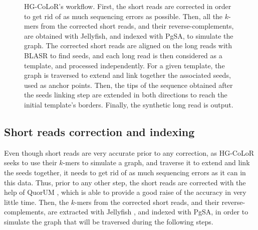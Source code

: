 \documentclass[long, final]{jobim2017}
\begin{document}
\begin{figure}
	\begin{center}
	\end{center}
	\caption{HG-CoLoR's workflow. First, the short reads are corrected in order to get rid of as much sequencing errors as possible. Then,
	all the $k$-mers from the corrected short reads, and their reverse-complements, are obtained with Jellyfish, and indexed with PgSA, to
	simulate the graph.
	The corrected short reads are aligned on the long reads with BLASR to find seeds, and each long read is then considered as a template, and
	processed
	independently. For a given template, the graph is traversed to extend and link together the associated seeds, used as
	anchor points. Then, the tips of the sequence obtained after the seeds linking step are extended in both directions to reach the initial
	template's borders. Finally, the synthetic long read is output. \label{OMWorkflow}}
\end{figure}

\subsection{Short reads correction and indexing}

Even though short reads are very accurate prior to any correction, as HG-CoLoR seeks to use their $k$-mers to simulate a graph, and traverse it to extend and link the seeds together, it needs to get rid of as much sequencing errors as it can in this data. Thus, prior to any other step, the short reads are corrected with the help of QuorUM \cite{Marcais2015}, which is able to provide a good raise of the accuracy in very little time. Then, the $k$-mers from the corrected short reads, and their reverse-complements, are extracted with Jellyfish \cite{Marcais2011}, and indexed with PgSA, in order to simulate the graph that will be traversed during the following steps.
\end{document}
